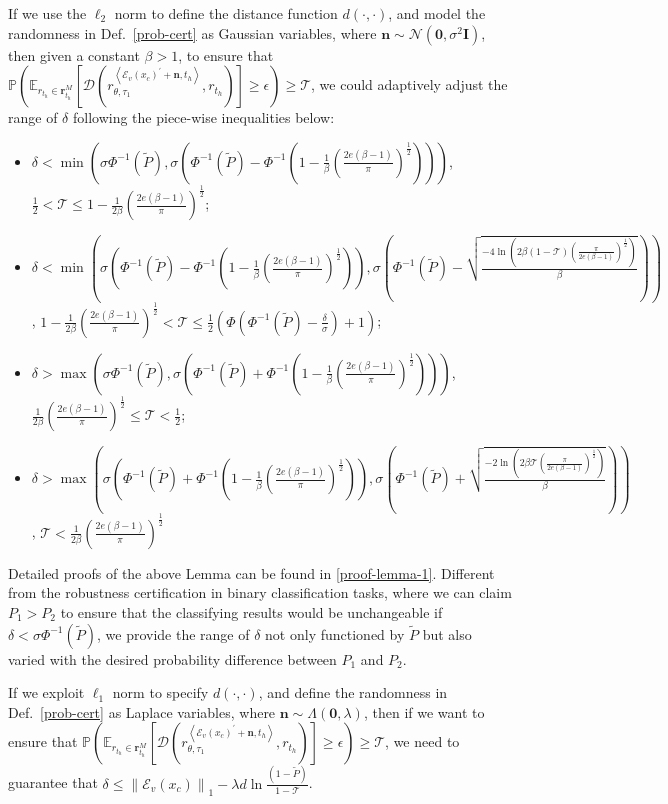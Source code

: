 \begin{lemma}
\label{certified_l2}
If we use the $\ell_2$ norm to define the distance function $d(\cdot, \cdot)$, and model the randomness in Def.~\ref{prob-cert} as Gaussian variables, where $\mathbf{n}\sim\mathcal{N}(\mathbf{0}, \sigma^2\mathbf{I})$, then given a constant $\beta>1$, to ensure that $\mathbb{P}(\mathbb{E}_{r_{t_h}\in\mathbf{r}_{t_h}^M}[\mathcal{D}(r_{\theta, \tau_1}^{\left<\mathcal{E}_v(x_c)^{\prime}+\mathbf{n}, t_h\right>}, r_{t_h})]\geq\epsilon)\geq\mathcal{T}$, we could adaptively adjust the range of $\delta$ following the piece-wise inequalities below:
\begin{itemize}
\scriptsize
\item$\delta<\min(\sigma\Phi^{-1}(\tilde{P}),\sigma(\Phi^{-1}(\tilde{P})-\Phi^{-1}(1-\frac{1}{\beta}(\frac{2e(\beta-1)}{\pi})^{\frac{1}{2}})))$, $\frac{1}{2}<\mathcal{T}\leq1-\frac{1}{2\beta}(\frac{2e(\beta-1)}{\pi})^{\frac{1}{2}}$;
\item$\delta<\min(\sigma(\Phi^{-1}(\tilde{P})-\Phi^{-1}(1-\frac{1}{\beta}(\frac{2e(\beta-1)}{\pi})^{\frac{1}{2}})),\sigma(\Phi^{-1}(\tilde{P})-\sqrt{\frac{-4\ln(2\beta(1-\mathcal{T})(\frac{\pi}{2e(\beta-1)})^{\frac{1}{2}})}{\beta}}))$, $1-\frac{1}{2\beta}(\frac{2e(\beta-1)}{\pi})^{\frac{1}{2}}<\mathcal{T}\leq\frac{1}{2}(\Phi(\Phi^{-1}(\tilde{P})-\frac{\delta}{\sigma})+1)$;
\item$\delta >\max(\sigma\Phi^{-1}(\tilde{P}),\sigma(\Phi^{-1}(\tilde{P})+\Phi^{-1}(1-\frac{1}{\beta}(\frac{2e(\beta-1)}{\pi})^{\frac{1}{2}})))$, $\frac{1}{2\beta}(\frac{2e(\beta-1)}{\pi})^{\frac{1}{2}}\leq \mathcal{T}<\frac{1}{2}$;
\item$\delta>\max(\sigma(\Phi^{-1}(\tilde{P})+\Phi^{-1}(1-\frac{1}{\beta}(\frac{2e(\beta-1)}{\pi})^{\frac{1}{2}})),\sigma(\Phi^{-1}(\tilde{P})+\sqrt{\frac{-2\ln(2\beta\mathcal{T}(\frac{\pi}{2e(\beta-1)})^{\frac{1}{2}})}{\beta}}))$, $\mathcal{T}<\frac{1}{2\beta}(\frac{2e(\beta-1)}{\pi})^{\frac{1}{2}}$
\end{itemize}
\end{lemma}
Detailed proofs of the above Lemma can be found in \ref{proof-lemma-1}. Different from the robustness certification in binary classification tasks, where we can claim $P_1>P_2$ to ensure that the classifying results would be unchangeable if $\delta<\sigma\Phi^{-1}(\tilde{P})$, we provide the range of $\delta$ not only functioned by $\tilde{P}$ but also varied with the desired probability difference between $P_1$ and $P_2$. 
\begin{lemma}
\label{certified_l1}
If we exploit $\ell_1$ norm to specify $d(\cdot, \cdot)$, and define the randomness in Def.~\ref{prob-cert} as Laplace variables, where $\mathbf{n}\sim\Lambda(\mathbf{0}, \lambda)$, then if we want to ensure that $\mathbb{P}(\mathbb{E}_{r_{t_h}\in\mathbf{r}_{t_h}^M}[\mathcal{D}(r_{\theta, \tau_1}^{\left<\mathcal{E}_v(x_c)^{\prime}+\mathbf{n}, t_h\right>}, r_{t_h})]\geq\epsilon)\geq\mathcal{T}$, we need to guarantee that $\delta \leq \left\|\mathcal{E}_v(x_c)\right\|_1-\lambda d\ln\frac{(1-\tilde{P})}{1-\mathcal{T}}$.
\end{lemma}
